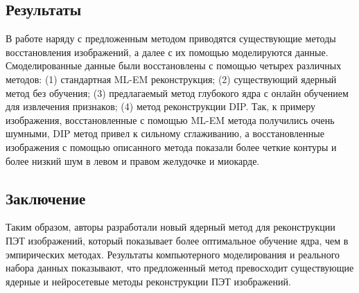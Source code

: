\subsection*{Результаты}
В работе наряду с предложенным методом приводятся существующие методы восстановления 
изображений, а далее с их помощью моделируются данные. Смоделированные данные были восстановлены с 
помощью четырех различных методов: (1) стандартная ML-EM реконструкция; (2) существующий ядерный метод без обучения; 
(3) предлагаемый метод глубокого ядра с онлайн обучением для извлечения признаков; (4) метод реконструкции DIP. 
Так, к примеру изображения, восстановленные с помощью ML-EM метода получились очень шумными, DIP метод привел к сильному сглаживанию, 
а восстановленные изображения с помощью описанного метода показали более четкие контуры и более низкий шум в левом и правом желудочке и миокарде.
\subsection*{Заключение}
Таким образом, авторы разработали новый ядерный метод для реконструкции ПЭТ изображений, который показывает более 
оптимальное обучение ядра, чем в эмпирических методах. Результаты компьютерного моделирования и реального набора 
данных показывают, что предложенный метод превосходит существующие ядерные и нейросетевые методы реконструкции ПЭТ изображений.
